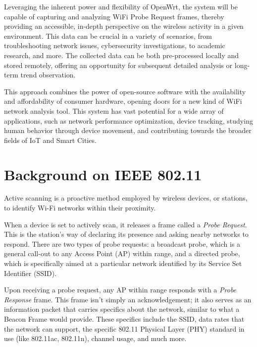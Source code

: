 \documentclass{article}
\begin{document}
Leveraging the inherent power and flexibility of OpenWrt, the system will be capable of capturing and analyzing WiFi Probe Request frames, thereby providing an accessible, in-depth perspective on the wireless activity in a given environment. This data can be crucial in a variety of scenarios, from troubleshooting network issues, cybersecurity investigations, to academic research, and more.
The collected data can be both pre-processed locally and stored remotely, offering an opportunity for subsequent detailed analysis or long-term trend observation.

This approach combines the power of open-source software with the availability and affordability of consumer hardware, opening doors for a new kind of WiFi network analysis tool. This system has vast potential for a wide array of applications, such as network performance optimization, device tracking, studying human behavior through device movement, and contributing towards the broader fields of IoT and Smart Cities.



\section{Background on IEEE 802.11}

\begin{info}
    Active scanning is a proactive method employed by wireless devices, or stations, to identify Wi-Fi networks within their proximity.
\end{info}

When a device is set to actively scan, it releases a frame called a \textit{Probe Request}. This is the station's way of declaring its presence and asking nearby networks to respond. There are two types of probe requests: a broadcast probe, which is a general call-out to any Access Point (AP) within range, and a directed probe, which is specifically aimed at a particular network identified by its Service Set Identifier (SSID).

Upon receiving a probe request, any AP within range responds with a \textit{Probe Response} frame. This frame isn't simply an acknowledgement; it also serves as an information packet that carries specifics about the network, similar to what a Beacon Frame would provide. These specifics include the SSID, data rates that the network can support, the specific 802.11 Physical Layer (PHY) standard in use (like 802.11ac, 802.11n), channel usage, and much more. 
\end{document}
